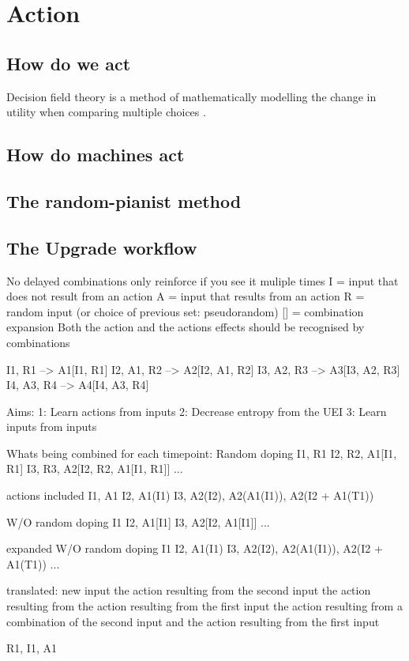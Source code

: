 \chapter{Action}
\section{How do we act}
Decision field theory is a method of mathematically modelling the change in utility when comparing multiple choices \cite{busemeyer2002survey}.

\section{How do machines act}

\section{The random-pianist method}

\section{The Upgrade workflow}
No delayed combinations
only reinforce if you see it muliple times
I = input that does not result from an action
A = input that results from an action
R = random input (or choice of previous set: pseudorandom)
[] = combination expansion
Both the action and the actions effects should be recognised by combinations

I1, R1        -->    A1[I1, R1]
I2, A1, R2    -->    A2[I2, A1, R2]
I3, A2, R3    -->    A3[I3, A2, R3]
I4, A3, R4    -->    A4[I4, A3, R4]

Aims:
1: Learn actions from inputs
2: Decrease entropy from the UEI
3: Learn inputs from inputs

Whats being combined for each timepoint:
Random doping
I1, R1
I2, R2, A1[I1, R1]
I3, R3, A2[I2, R2, A1[I1, R1]]
...

actions included
I1, A1
I2, A1(I1)
I3, A2(I2), A2(A1(I1)), A2(I2 + A1(T1))

W/O random doping
I1
I2, A1[I1]
I3, A2[I2, A1[I1]]
...

expanded W/O random doping
I1
I2, A1(I1)
I3, A2(I2), A2(A1(I1)), A2(I2 + A1(T1))
...

translated:
new input
the action resulting from the second input
the action resulting from the action resulting from the first input
the action resulting from a combination of the second input and the action resulting from the first input 

R1, I1, A1
